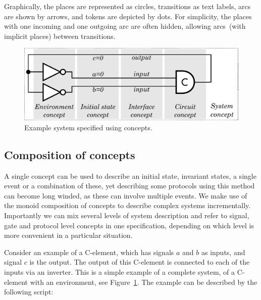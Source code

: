 \documentclass[british,compsoc]{IEEEtran}
\begin{document}
Graphically, the places are represented as circles, transitions as
text labels, arcs are shown by arrows, and tokens are depicted by dots.
For simplicity, the places with one incoming
and one outgoing arc are often hidden, allowing arcs~(with implicit
places) between transitions.

\begin{figure}[t]
\begin{centering}
\includegraphics[scale=0.51]{Images/C-element-with-environment}
\par\end{centering}
\vspace{-1mm}
\protect\caption{\label{fig:cElement-concepts}Example system specified using concepts.}
\vspace{-5mm}
\end{figure}

\vspace{-1mm}
\subsection{Composition of concepts\label{sub:Comp-of-concepts}}

A single concept can be used to describe an initial state, invariant
states, a single event or a combination of these, yet describing some
protocols using this method can become long winded, as these can involve
multiple events. We make use of the monoid composition of concepts
to describe complex systems incrementally. Importantly we can mix
several levels of system description and refer to signal, gate and
protocol level concepts in one specification, depending on which level
is more convenient in a particular situation.

Consider an example of a C-element, which has signals $a$ and $b$ as inputs,
and signal $c$ is the output. The output of this C-element is connected to
each of the inputs via an inverter. This is a simple example of a complete
system, of a C-element with an environment, see Figure~\ref{fig:cElement-concepts}.
The example can be described by the following script:
\end{document}

